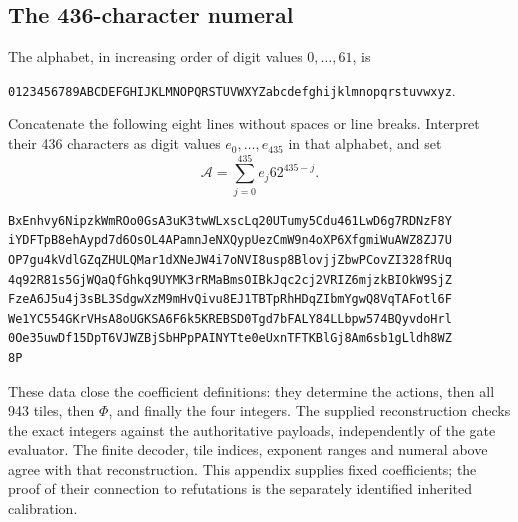 \subsection{The 436-character numeral}

The alphabet, in increasing order of digit values $0,\ldots,61$, is
\begin{center}
\texttt{0123456789ABCDEFGHIJKLMNOPQRSTUVWXYZabcdefghijklmnopqrstuvwxyz}.
\end{center}
Concatenate the following eight lines without spaces or line breaks.
Interpret their 436 characters as digit values $e_0,\ldots,e_{435}$ in
that alphabet, and set
\[
 \mathcal A=\sum_{j=0}^{435}e_j62^{435-j}.
\]
\begin{lstlisting}[basicstyle=\small\ttfamily,breaklines=false]
BxEnhvy6NipzkWmROo0GsA3uK3twWLxscLq20UTumy5Cdu461LwD6g7RDNzF8Y
iYDFTpB8ehAypd7d6OsOL4APamnJeNXQypUezCmW9n4oXP6XfgmiWuAWZ8ZJ7U
OP7gu4kVdlGZqZHULQMar1dXNeJW4i7oNVI8usp8BlovjjZbwPCovZI328fRUq
4q92R81s5GjWQaQfGhkq9UYMK3rRMaBmsOIBkJqc2cj2VRIZ6mjzkBIOkW9SjZ
FzeA6J5u4j3sBL3SdgwXzM9mHvQivu8EJ1TBTpRhHDqZIbmYgwQ8VqTAFotl6F
We1YC554GKrVHsA8oUGKSA6F6k5KREBSD0Tgd7bFALY84LLbpw574BQyvdoHrl
0Oe35uwDf15DpT6VJWZBjSbHPpPAINYTte0eUxnTFTKBlGj8Am6sb1gLldh8WZ
8P
\end{lstlisting}

These data close the coefficient definitions: they determine the actions,
then all 943 tiles, then $\Phi$, and finally the four integers.
The supplied reconstruction checks the exact integers against the
authoritative payloads, independently of the gate evaluator.  The finite
decoder, tile indices, exponent ranges and numeral above agree with that
reconstruction.  This appendix supplies fixed coefficients; the proof
of their connection to refutations is the separately identified inherited
calibration.
